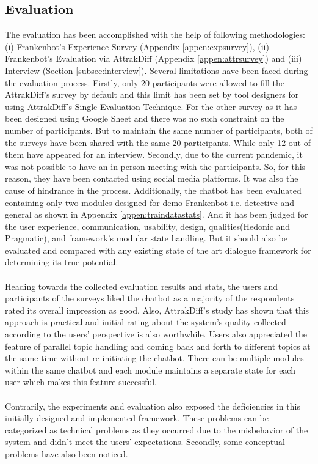 \subsection{Evaluation}
The evaluation has been accomplished with the help of following methodologies: (i) Frankenbot's Experience Survey (Appendix \ref{appen:expsurvey}), (ii) Frankenbot's Evaluation via AttrakDiff (Appendix \ref{appen:attrsurvey}) and (iii) Interview (Section \ref{subsec:interview}). Several limitations have been faced during the evaluation process. Firstly, only 20 participants were allowed to fill the AttrakDiff's survey by default and this limit has been set by tool designers for using AttrakDiff's Single Evaluation Technique. For the other survey as it has been designed using Google Sheet and there was no such constraint on the number of participants. But to maintain the same number of participants, both of the surveys have been shared with the same 20 participants. While only 12 out of them have appeared for an interview. Secondly, due to the current pandemic, it was not possible to have an in-person meeting with the participants. So, for this reason, they have been contacted using social media platforms. It was also the cause of hindrance in the process. Additionally, the chatbot has been evaluated containing only two modules designed for demo Frankenbot i.e. detective and general as shown in Appendix \ref{appen:traindatastats}. And it has been judged for the user experience, communication, usability, design, qualities(Hedonic and Pragmatic), and framework's modular state handling. But it should also be evaluated and compared with any existing state of the art dialogue framework for determining its true potential.
\\~\\
Heading towards the collected evaluation results and stats, the users and participants of the surveys liked the chatbot as a majority of the respondents rated its overall impression as good. Also, AttrakDiff's study has shown that this approach is practical and initial rating about the system's quality collected according to the users' perspective is also worthwhile. Users also appreciated the feature of parallel topic handling and coming back and forth to different topics at the same time without re-initiating the chatbot. There can be multiple modules within the same chatbot and each module maintains a separate state for each user which makes this feature successful.
\\~\\
Contrarily, the experiments and evaluation also exposed the deficiencies in this initially designed and implemented framework. These problems can be categorized as technical problems as they occurred due to the misbehavior of the system and didn't meet the users' expectations. Secondly, some conceptual problems have also been noticed.
